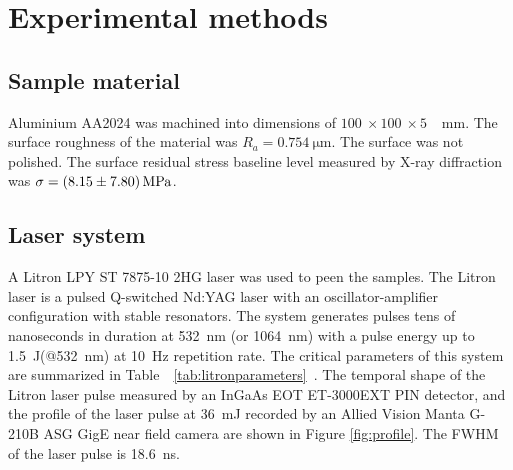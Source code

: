 \section{Experimental methods} \label{sec:develop}
    


\subsection{Sample material}
    Aluminium AA2024 was machined into dimensions of \(\SI[]{100}{} \times \SI[]{100}{} \times \SI[]{5}{}\) \SI[]{}{\mm}. The surface roughness of the material was \( R_a  = \SI[]{0.754}{\micro\metre} \). The surface was not polished.  The surface residual stress baseline level measured by X-ray diffraction was  \( \SI[]{}{\sigma}  = \SI[separate-uncertainty = true]{8.15 \pm 7.80 }{\mega\pascal} \).




\subsection{Laser system}

    A Litron LPY ST 7875-10 2HG laser was used to peen the samples. The Litron laser is a pulsed Q-switched Nd:YAG laser with an oscillator-amplifier configuration with stable resonators. The system generates pulses tens of nanoseconds in duration at \SI{532}{\nano\meter} (or \SI{1064}{\nano\meter}) with a pulse energy up to \SI{1.5}{\joule }(@\SI{532}{\nano\meter}) at \SI{10}{\hertz} repetition rate. The critical parameters of this system are summarized in Table~~\ref{tab:litronparameters}~\cite{litron}. The temporal shape of the Litron laser pulse measured by an InGaAs EOT ET-3000EXT PIN detector, and the profile of the laser pulse at \SI{36}{\milli\joule} recorded by an Allied Vision Manta G-210B ASG GigE near field camera are shown in Figure \ref{fig:profile}. The FWHM of the laser pulse is \SI{18.6}{\ns}.



